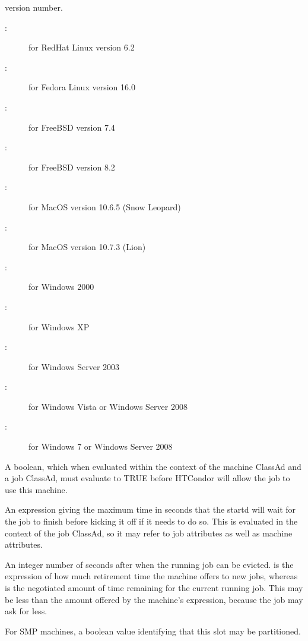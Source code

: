 \begin{description}
version number.
	\begin{description}
	\item[:] for RedHat Linux version 6.2
	\item[:] for Fedora Linux version 16.0
	\item[:] for FreeBSD version 7.4
	\item[:] for FreeBSD version 8.2
	\item[:] for MacOS version 10.6.5 (Snow Leopard)
	\item[:] for MacOS version 10.7.3 (Lion)
	\item[:] for Windows 2000
	\item[:] for Windows XP
	\item[:] for Windows Server 2003
	\item[:] for Windows Vista or Windows Server 2008
	\item[:] for Windows 7 or Windows Server 2008
	\end{description}
%
\item[\AdAttr{Requirements}:] A boolean, which when evaluated within the context
of the machine ClassAd and a job ClassAd, must evaluate to
TRUE before HTCondor will allow the job to use this machine.
%
\item[\AdAttr{MaxJobRetirementTime}:] An expression giving the
maximum time in seconds that the startd will wait for the job to
finish before kicking it off if it needs to do so.  This is evaluated
in the context of the job ClassAd, so it may refer to job attributes
as well as machine attributes.
%
\item[\AdAttr{RetirementTimeRemaining}:] An integer number of seconds
after  when the running job can be evicted.
 is the expression of how much retirement
time the machine offers to new jobs, whereas 
is the negotiated amount of time remaining for the current running
job.  This may be less than the amount offered by the machine's
 expression, because the job may
ask for less.
%
\label{PartitionableSlot-machine-attribute} 
\item[\AdAttr{PartitionableSlot}:] For SMP machines,
a boolean value identifying that this slot may be partitioned.

\end{description}
